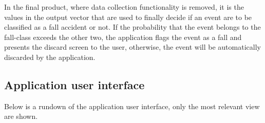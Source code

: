 \documentclass[12pt, a4paper, onecolumn]{article}
\begin{document}
	In the final product, where data collection functionality is removed, it is the values in the output vector that are used to finally decide if an event are to be classified as a fall accident or not. If the probability that the event belongs to the fall-class exceeds the other two, the application flags the event as a fall and presents the discard screen to the user, otherwise, the event will be automatically discarded by the application. 
	
	\newpage
\subsection{Application user interface}
	
	Below is a rundown of the application user interface, only the most relevant view are shown.
	
\end{document}
